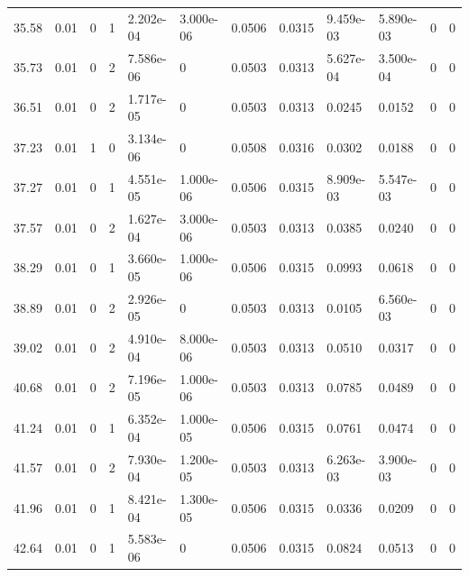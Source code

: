 \documentclass[preview]{standalone}
\begin{document}
{{{\begin{tabular}{L{1.2cm}C{1.2cm} C{0.3cm}C{0.5cm} C{1.4cm}C{1.4cm} C{1.4cm}C{1.4cm} C{1.6cm}C{1.6cm} C{1.6cm}C{1.6cm}}
  35.58  &  0.01  & 0     &  1 &  2.202e-04  & 3.000e-06  &  0.0506&   0.0315& 9.459e-03 & 5.890e-03   &  0 & 0  \\ 
  35.73  &  0.01  & 0     &  2 &  7.586e-06  & 0  &  0.0503&   0.0313& 5.627e-04 & 3.500e-04   &  0 & 0  \\ 
  36.51  &  0.01  & 0     &  2 &  1.717e-05  & 0  &  0.0503&   0.0313& 0.0245 & 0.0152   &  0 & 0  \\ 
  37.23  &  0.01  & 1     &  0 &  3.134e-06  & 0  &  0.0508&   0.0316& 0.0302 & 0.0188   &  0 & 0  \\ 
  37.27  &  0.01  & 0     &  1 &  4.551e-05  & 1.000e-06  &  0.0506&   0.0315& 8.909e-03 & 5.547e-03   &  0 & 0  \\ 
  37.57  &  0.01  & 0     &  2 &  1.627e-04  & 3.000e-06  &  0.0503&   0.0313& 0.0385 & 0.0240   &  0 & 0  \\ 
  38.29  &  0.01  & 0     &  1 &  3.660e-05  & 1.000e-06  &  0.0506&   0.0315& 0.0993 & 0.0618   &  0 & 0  \\ 
  38.89  &  0.01  & 0     &  2 &  2.926e-05  & 0  &  0.0503&   0.0313& 0.0105 & 6.560e-03   &  0 & 0  \\ 
  39.02  &  0.01  & 0     &  2 &  4.910e-04  & 8.000e-06  &  0.0503&   0.0313& 0.0510 & 0.0317   &  0 & 0  \\ 
  40.68  &  0.01  & 0     &  2 &  7.196e-05  & 1.000e-06  &  0.0503&   0.0313& 0.0785 & 0.0489   &  0 & 0  \\ 
  41.24  &  0.01  & 0     &  1 &  6.352e-04  & 1.000e-05  &  0.0506&   0.0315& 0.0761 & 0.0474   &  0 & 0  \\ 
  41.57  &  0.01  & 0     &  2 &  7.930e-04  & 1.200e-05  &  0.0503&   0.0313& 6.263e-03 & 3.900e-03   &  0 & 0  \\ 
  41.96  &  0.01  & 0     &  1 &  8.421e-04  & 1.300e-05  &  0.0506&   0.0315& 0.0336 & 0.0209   &  0 & 0  \\ 
  42.64  &  0.01  & 0     &  1 &  5.583e-06  & 0  &  0.0506&   0.0315& 0.0824 & 0.0513   &  0 & 0  \\ 
\hline 
\end{tabular} 

}}}
\end{document}

